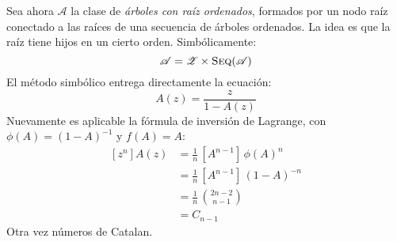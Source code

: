   Sea ahora \(\mathscr{A}\)
  la clase de \emph{árboles con raíz ordenados},
  formados por un nodo raíz
  conectado a las raíces de una secuencia de árboles ordenados.
  La idea es que la raíz tiene hijos en un cierto orden.
  Simbólicamente:
  \begin{equation*}
    \mathscr{A}
      = \mathscr{Z} \times \operatorname{\textsc{Seq}}(\mathscr{A})
  \end{equation*}
  El método simbólico entrega directamente la ecuación:
  \begin{equation*}
    A(z)
      = \frac{z}{1 - A(z)}
  \end{equation*}
  Nuevamente es aplicable la fórmula de inversión de Lagrange,
  con \(\phi(A) = (1 - A)^{-1}\) y \(f(A) = A\):
  \begin{align*}
    \left[ z^n \right] A(z)
      &= \frac{1}{n} \, \left[ A^{n - 1} \right] \, \phi(A)^n \\
      &= \frac{1}{n} \, \left[ A^{n - 1} \right] \, (1 - A)^{-n} \\
      &= \frac{1}{n} \, \binom{2 n - 2}{n - 1} \\
      &= C_{n - 1}
  \end{align*}
  Otra vez números de Catalan.

